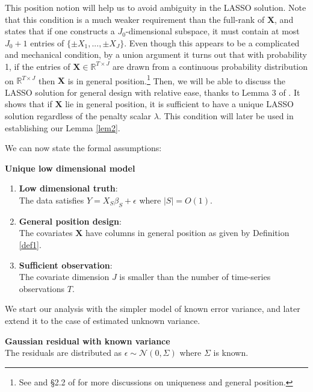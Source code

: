 \documentclass[11pt]{article}
\newcommand{\RR}{\mathbb{R}}
\begin{document}
This position notion will help us to avoid ambiguity in the LASSO solution. Note that this condition is a much weaker requirement than the full-rank of $\bm{X}$, and states that if one constructs a $J_0$-dimensional subspace, it must contain at most $J_0+1$ entries of $\{\pm X_1,...,\pm X_J \}$. Even though this appears to be a complicated and mechanical condition, by a union argument it turns out that with probability 1, if the entries of $\bm{X}\in\RR^{T\times J}$ are drawn from a continuous probability distribution on $\RR^{T \times J}$ then $\bm{X}$ is in general position.\footnote{See \cite{cpa.20132} and \S2.2 of \cite{10.1214/13-EJS815} for more discussions on uniqueness and general position.} Then, we will be able to discuss the LASSO solution for general design with relative ease, thanks to Lemma 3 of \cite{10.1214/13-EJS815}. It shows that if $\bm{X}$ lie in general position,  it is sufficient to have a unique LASSO solution regardless of the penalty scalar $\lambda$. This condition will later be used in establishing our Lemma \ref{lem2}.

We can now state the formal assumptions:
\begin{assumption_app}\label{asu1} {\bf Unique low dimensional model}
	\vspace{-0.1cm}
	\begin{enumerate}[label=(\alph*)]
		\item {\bf Low dimensional truth}:\\
		The data satisfies $Y=X_S\beta_S+\epsilon$ where $|S|=O(1)$.
		\item {\bf General position design}:\\
		The covariates $\bm{X}$ have columns in general position as given by Definition \ref{def1}.
	\item {\bf Sufficient observation}:\\
The covariate dimension $J$ is smaller than the number of time-series observations $T$.
		
	\end{enumerate}
\end{assumption_app}

We start our analysis with the simpler model of known error variance, and later extend it to the case of estimated unknown variance.

\begin{assumption_app}\label{asu_known} {\bf Gaussian residual with known variance}\\
	The residuals are distributed as $\epsilon\sim \mathcal{N}(0,\Sigma)$ where $\Sigma$ is known.
\end{assumption_app}
\end{document}
